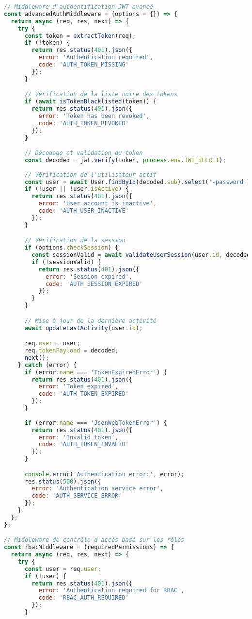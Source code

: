 \documentclass[12pt,a4paper]{report}
\begin{document}
\begin{lstlisting}[language=JavaScript, caption=Middleware de sécurité complet]
// Middleware d'authentification JWT avancé
const advancedAuthMiddleware = (options = {}) => {
  return async (req, res, next) => {
    try {
      const token = extractToken(req);
      if (!token) {
        return res.status(401).json({ 
          error: 'Authentication required',
          code: 'AUTH_TOKEN_MISSING'
        });
      }

      // Vérification de la liste noire des tokens
      if (await isTokenBlacklisted(token)) {
        return res.status(401).json({
          error: 'Token has been revoked',
          code: 'AUTH_TOKEN_REVOKED'
        });
      }

      // Décodage et validation du token
      const decoded = jwt.verify(token, process.env.JWT_SECRET);
      
      // Vérification de l'utilisateur actif
      const user = await User.findById(decoded.sub).select('-password');
      if (!user || !user.isActive) {
        return res.status(401).json({
          error: 'User account is inactive',
          code: 'AUTH_USER_INACTIVE'
        });
      }

      // Vérification de la session
      if (options.checkSession) {
        const sessionValid = await validateUserSession(user.id, decoded.sessionId);
        if (!sessionValid) {
          return res.status(401).json({
            error: 'Session expired',
            code: 'AUTH_SESSION_EXPIRED'
          });
        }
      }

      // Mise à jour de la dernière activité
      await updateLastActivity(user.id);

      req.user = user;
      req.tokenPayload = decoded;
      next();
    } catch (error) {
      if (error.name === 'TokenExpiredError') {
        return res.status(401).json({
          error: 'Token expired',
          code: 'AUTH_TOKEN_EXPIRED'
        });
      }
      
      if (error.name === 'JsonWebTokenError') {
        return res.status(401).json({
          error: 'Invalid token',
          code: 'AUTH_TOKEN_INVALID'
        });
      }

      console.error('Authentication error:', error);
      res.status(500).json({
        error: 'Authentication service error',
        code: 'AUTH_SERVICE_ERROR'
      });
    }
  };
};

// Middleware de contrôle d'accès basé sur les rôles
const rbacMiddleware = (requiredPermissions) => {
  return async (req, res, next) => {
    try {
      const user = req.user;
      if (!user) {
        return res.status(401).json({
          error: 'Authentication required for RBAC',
          code: 'RBAC_AUTH_REQUIRED'
        });
      }


\end{lstlisting}
\end{document}
